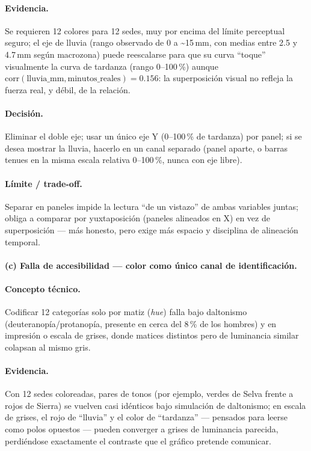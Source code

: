 \paragraph{Evidencia.} Se requieren 12 colores para 12 sedes, muy por encima del límite perceptual seguro; el eje de lluvia (rango observado de 0 a \textasciitilde 15\,mm, con medias entre 2.5 y 4.7\,mm según macrozona) puede reescalarse para que su curva ``toque'' visualmente la curva de tardanza (rango 0--100\,\%) aunque $\mathrm{corr}(\text{lluvia\_mm}, \text{minutos\_reales}) = 0.156$: la superposición visual no refleja la fuerza real, y débil, de la relación.

\paragraph{Decisión.} Eliminar el doble eje; usar un único eje Y (0--100\,\% de tardanza) por panel; si se desea mostrar la lluvia, hacerlo en un canal separado (panel aparte, o barras tenues en la misma escala relativa 0--100\,\%, nunca con eje libre).

\paragraph{Límite / trade-off.} Separar en paneles impide la lectura ``de un vistazo'' de ambas variables juntas; obliga a comparar por yuxtaposición (paneles alineados en X) en vez de superposición --- más honesto, pero exige más espacio y disciplina de alineación temporal.

\paragraph{(c) Falla de accesibilidad --- color como único canal de identificación.}

\paragraph{Concepto técnico.} Codificar 12 categorías solo por matiz (\emph{hue}) falla bajo daltonismo (deuteranopía/protanopía, presente en cerca del 8\,\% de los hombres) y en impresión o escala de grises, donde matices distintos pero de luminancia similar colapsan al mismo gris.

\paragraph{Evidencia.} Con 12 sedes coloreadas, pares de tonos (por ejemplo, verdes de Selva frente a rojos de Sierra) se vuelven casi idénticos bajo simulación de daltonismo; en escala de grises, el rojo de ``lluvia'' y el color de ``tardanza'' --- pensados para leerse como polos opuestos --- pueden converger a grises de luminancia parecida, perdiéndose exactamente el contraste que el gráfico pretende comunicar.

